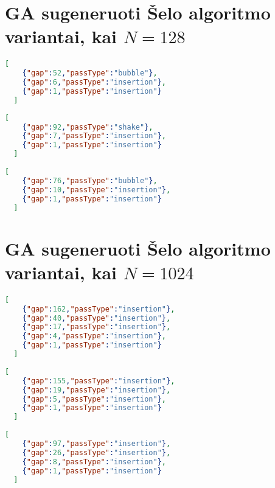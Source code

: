 \documentclass{VUMIFInfBakalaurinis}
\begin{document}
\section{GA sugeneruoti Šelo algoritmo variantai, kai $N = 128$}

\begin{lstlisting}[caption={Algoritmas A1},label={alg:A1},language=json]
  [
    {"gap":52,"passType":"bubble"}, 
    {"gap":6,"passType":"insertion"}, 
    {"gap":1,"passType":"insertion"}
  ]
\end{lstlisting}

\begin{lstlisting}[caption={Algoritmas A2},label={alg:A2},language=json]
  [
    {"gap":92,"passType":"shake"}, 
    {"gap":7,"passType":"insertion"}, 
    {"gap":1,"passType":"insertion"}
  ]
\end{lstlisting}

\begin{lstlisting}[caption={Algoritmas A3},label={alg:A3},language=json]
  [
    {"gap":76,"passType":"bubble"}, 
    {"gap":10,"passType":"insertion"}, 
    {"gap":1,"passType":"insertion"}
  ]
\end{lstlisting}

\section{GA sugeneruoti Šelo algoritmo variantai, kai $N = 1024$}

\begin{lstlisting}[caption={Algoritmas B1},label={alg:B1},language=json]
  [
    {"gap":162,"passType":"insertion"}, 
    {"gap":40,"passType":"insertion"}, 
    {"gap":17,"passType":"insertion"}, 
    {"gap":4,"passType":"insertion"}, 
    {"gap":1,"passType":"insertion"}
  ]
\end{lstlisting}

\begin{lstlisting}[caption={Algoritmas B2},label={alg:B2},language=json]
  [
    {"gap":155,"passType":"insertion"}, 
    {"gap":19,"passType":"insertion"}, 
    {"gap":5,"passType":"insertion"}, 
    {"gap":1,"passType":"insertion"}
  ]
\end{lstlisting}

\begin{lstlisting}[caption={Algoritmas B3},label={alg:B3},language=json]
  [
    {"gap":97,"passType":"insertion"}, 
    {"gap":26,"passType":"insertion"}, 
    {"gap":8,"passType":"insertion"}, 
    {"gap":1,"passType":"insertion"}
  ]
\end{lstlisting}
\end{document}
